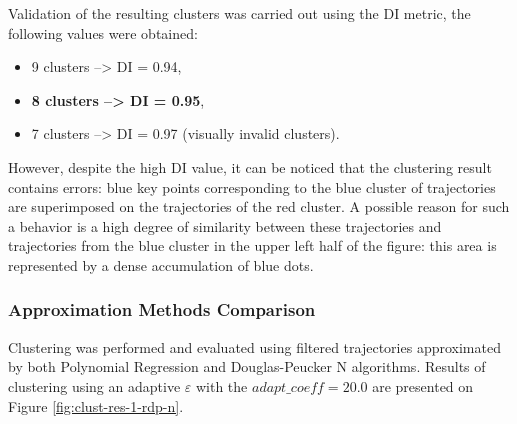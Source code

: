 Validation of the resulting clusters was carried out using the DI metric, the following values ​​were obtained:

\begin{itemize}
	\setlength\itemsep{0em}
	\item 9 clusters --> DI = 0.94,
	\item \textbf{8 clusters --> DI = 0.95},
	\item 7 clusters --> DI = 0.97 (visually invalid clusters).
\end{itemize}

However, despite the high DI value, it can be noticed that the clustering result contains errors: blue key points corresponding to the blue cluster of trajectories are superimposed on the trajectories of the red cluster. A possible reason for such a behavior is a high degree of similarity between these trajectories and trajectories from the blue cluster in the upper left half of the figure: this area is represented by a dense accumulation of blue dots.

\subsubsection{Approximation Methods Comparison}

Clustering was performed and evaluated using filtered trajectories approximated by both Polynomial Regression and Douglas-Peucker N algorithms. Results of clustering using an adaptive $\varepsilon$ with the $adapt\_coeff = 20.0$ are presented on Figure \ref{fig:clust-res-1-rdp-n}.

